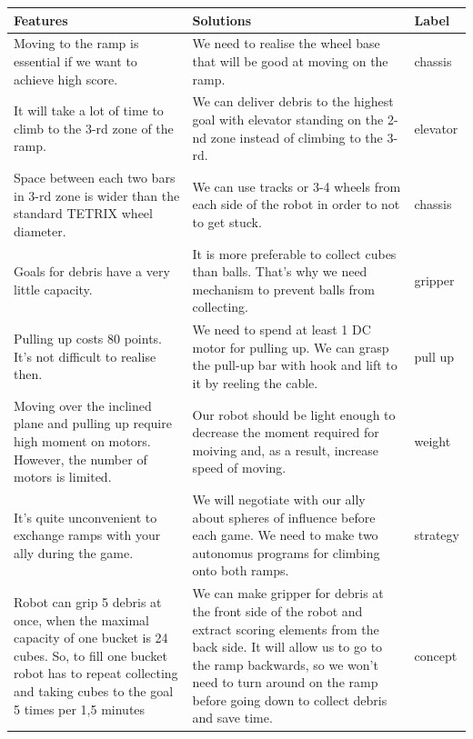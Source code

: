 	\begin{table}[H]
		\vspace{-2mm}
		\begin{center}
			\begin{tabular}{|p{0.4\linewidth}|p{0.5\linewidth}|p{0.1\linewidth}|}
				\hline
				Features & Solutions & Label \\
				\hline
				Moving to the ramp is essential if we want to achieve high score. & We need to realise the wheel base that will be good at moving on the ramp. & chassis \\
				\hline
				It will take a lot of time to climb to the 3-rd zone of the ramp. & We can deliver debris to the highest goal with elevator standing on the 2-nd zone instead of climbing to the 3-rd. & elevator \\
				\hline
				Space between each two bars in 3-rd zone is wider than the standard TETRIX wheel diameter. & We can use tracks or 3-4 wheels from each side of the robot in order to not to get stuck. & chassis \\
				\hline
				Goals for debris have a very little capacity. & It is more preferable to collect cubes than balls. That's why we need mechanism to prevent balls from collecting. & gripper \\
				\hline
				Pulling up costs 80 points. It's not difficult to realise then. & We need to spend at least 1 DC motor for pulling up. We can grasp the pull-up bar with hook and lift to it by reeling the cable. & pull up \\
				\hline
				Moving over the inclined plane and pulling up require high moment on motors. However, the number of motors is limited. & Our robot should be light enough to decrease the moment required for moiving and, as a result, increase speed of moving. & weight \\
				\hline
				It's quite unconvenient to exchange ramps with your ally during the game. & We will negotiate with our ally about spheres of influence before each game. We need to make two autonomus programs for climbing onto both ramps. & strategy \\
				\hline
				Robot can grip 5 debris at once, when the maximal capacity of one bucket is 24 cubes. So, to fill one bucket robot has to repeat collecting and taking cubes to the goal 5 times per 1,5 minutes & We can make gripper for debris at the front side of the robot and extract scoring elements from the back side. It will allow us to go to the ramp backwards, so we won't need to turn around on the ramp before going down to collect debris and save time. & concept \\

\end{tabular}
\end{center}
\end{table}
